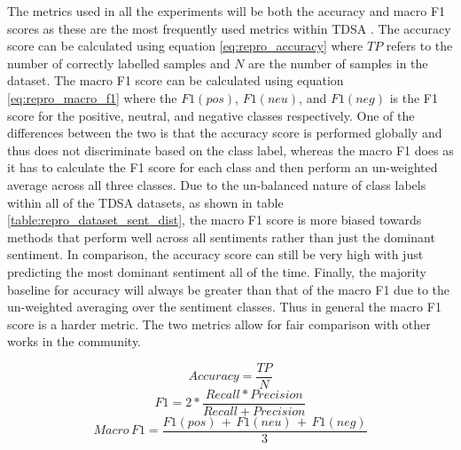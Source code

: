 The metrics used in all the experiments will be both the accuracy and macro F1 scores as these are the most frequently used metrics within TDSA \citep{dong-etal-2014-adaptive,wang-etal-2017-tdparse,he-etal-2018-exploiting}. The accuracy score can be calculated using equation \ref{eq:repro_accuracy} where $TP$ refers to the number of correctly labelled samples and $N$ are the number of samples in the dataset. The macro F1 score can be calculated using equation \ref{eq:repro_macro_f1} where the $F1(pos)$, $F1(neu)$, and $F1(neg)$ is the F1 score for the positive, neutral, and negative classes respectively. One of the differences between the two is that the accuracy score is performed globally and thus does not discriminate based on the class label, whereas the macro F1 does as it has to calculate the F1 score for each class and then perform an un-weighted average across all three classes. Due to the un-balanced nature of class labels within all of the TDSA datasets, as shown in table \ref{table:repro_dataset_sent_dist}, the macro F1 score is more biased towards methods that perform well across all sentiments rather than just the dominant sentiment. In comparison, the accuracy score can still be very high with just predicting the most dominant sentiment all of the time. Finally, the majority baseline for accuracy will always be greater than that of the macro F1 due to the un-weighted averaging over the sentiment classes. Thus in general the macro F1 score is a harder metric. The two metrics allow for fair comparison with other works in the community.

\begin{equation}
    Accuracy = \frac{TP}{N}
    \label{eq:repro_accuracy}
\end{equation}
\begin{equation}
    F1 = 2 * \frac{Recall * Precision}{Recall + Precision}
\end{equation}
\begin{equation}
    Macro\, F1 = \frac{F1(pos)\, +\, F1(neu)\, + \, F1(neg)}{3}
    \label{eq:repro_macro_f1}
\end{equation}

